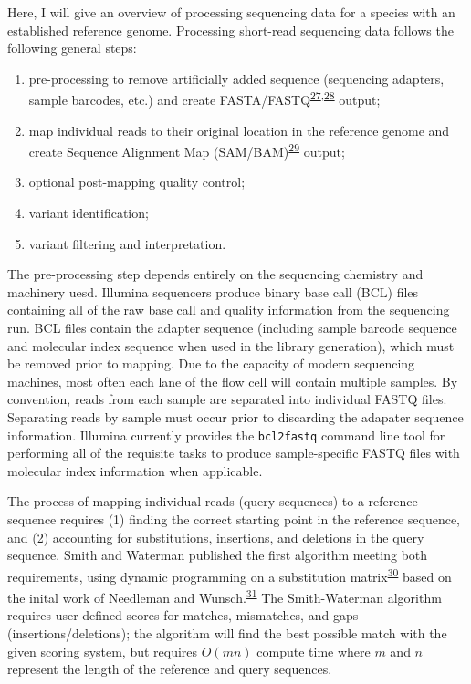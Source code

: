 \documentclass[11pt,letterpaper]{book}
\begin{document}
Here, I will give an overview of processing sequencing data for a species with an established reference genome.
Processing short-read sequencing data follows the following general steps:

\begin{enumerate}
\def\labelenumi{\arabic{enumi}.}
\item
  pre-processing to remove artificially added sequence (sequencing adapters, sample barcodes, etc.) and create FASTA/FASTQ\textsuperscript{\protect\hyperlink{ref-pearson:1988aa}{27},\protect\hyperlink{ref-cock:2010aa}{28}} output;
\item
  map individual reads to their original location in the reference genome and create Sequence Alignment Map (SAM/BAM)\textsuperscript{\protect\hyperlink{ref-li:2009aa}{29}} output;
\item
  optional post-mapping quality control;
\item
  variant identification;
\item
  variant filtering and interpretation.
\end{enumerate}

The pre-processing step depends entirely on the sequencing chemistry and machinery uesd.
Illumina sequencers produce binary base call (BCL) files containing all of the raw base call and quality information from the sequencing run.
BCL files contain the adapter sequence (including sample barcode sequence and molecular index sequence when used in the library generation), which must be removed prior to mapping.
Due to the capacity of modern sequencing machines, most often each lane of the flow cell will contain multiple samples.
By convention, reads from each sample are separated into individual FASTQ files.
Separating reads by sample must occur prior to discarding the adapater sequence information.
Illumina currently provides the \texttt{bcl2fastq} command line tool for performing all of the requisite tasks to produce sample-specific FASTQ files with molecular index information when applicable.

The process of mapping individual reads (query sequences) to a reference sequence requires (1) finding the correct starting point in the reference sequence, and (2) accounting for substitutions, insertions, and deletions in the query sequence.
Smith and Waterman published the first algorithm meeting both requirements, using dynamic programming on a substitution matrix\textsuperscript{\protect\hyperlink{ref-smith:1981aa}{30}} based on the inital work of Needleman and Wunsch.\textsuperscript{\protect\hyperlink{ref-needleman:1970aa}{31}}
The Smith-Waterman algorithm requires user-defined scores for matches, mismatches, and gaps (insertions/deletions); the algorithm will find the best possible match with the given scoring system, but requires \(O(mn)\) compute time where \(m\) and \(n\) represent the length of the reference and query sequences.
\end{document}
